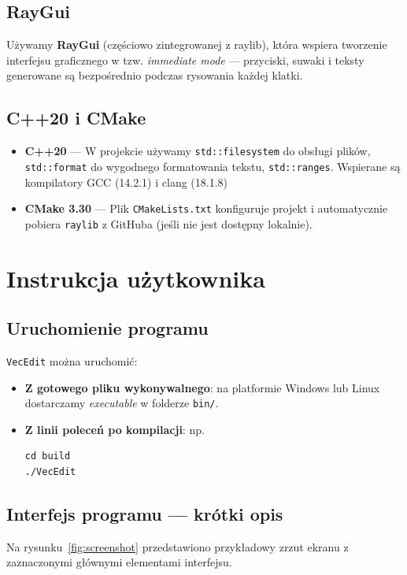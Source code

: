\documentclass[a4paper,12pt]{article}
\begin{document}
\subsection{RayGui}
Używamy \textbf{RayGui} (częściowo zintegrowanej z raylib), która wspiera tworzenie
interfejsu graficznego w tzw. \emph{immediate mode} — przyciski, suwaki i 
teksty generowane są bezpośrednio podczas rysowania każdej klatki.

\subsection{C++20 i CMake}
\begin{itemize}
    \item \textbf{C++20} — W projekcie używamy \texttt{std::filesystem} do obsługi plików,
      \texttt{std::format} do wygodnego formatowania tekstu, \texttt{std::ranges}. 
      Wspierane są kompilatory GCC (14.2.1) i clang (18.1.8)

    \item \textbf{CMake 3.30} — Plik \texttt{CMakeLists.txt} konfiguruje projekt
      i automatycznie pobiera \texttt{raylib} z GitHuba (jeśli nie jest dostępny lokalnie).
\end{itemize}

\section{Instrukcja użytkownika}

\subsection{Uruchomienie programu}
\texttt{VecEdit} można uruchomić:
\begin{itemize}
    \item \textbf{Z gotowego pliku wykonywalnego}: na platformie Windows lub Linux
    dostarczamy \emph{executable} w folderze \texttt{bin/}.
    \item \textbf{Z linii poleceń po kompilacji}: np.
\begin{verbatim}
cd build
./VecEdit
\end{verbatim}
\end{itemize}

\subsection{Interfejs programu — krótki opis}
Na rysunku~\ref{fig:screenshot} przedstawiono przykładowy zrzut ekranu 
z zaznaczonymi głównymi elementami interfejsu.
\end{document}

